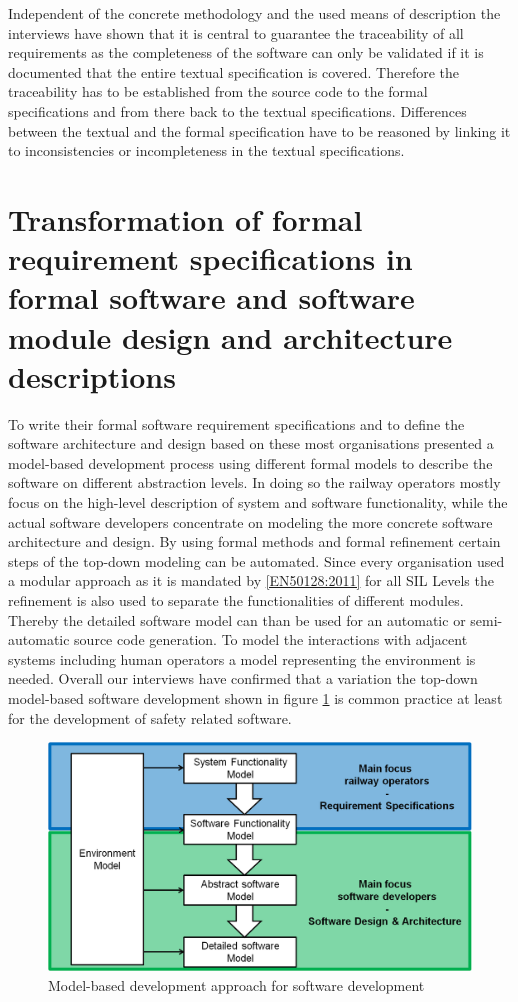 \documentclass{./template/openetcs_report}
\begin{document}
Independent of the concrete methodology and the used means of description the interviews have shown that it is central to guarantee the traceability of all requirements as the completeness of the software can only be validated if it is documented that the entire textual specification is covered. Therefore the traceability has to be established from the source code to the formal specifications and from there back to the textual specifications. Differences between the textual and the formal specification have to be reasoned by linking it to  inconsistencies or incompleteness in the textual specifications. 


\section{Transformation of formal requirement specifications in formal software and software module design and architecture descriptions}

To write their formal software requirement specifications and to define the software architecture and design based on these most organisations presented a model-based development process using different formal models to describe the software on different abstraction levels. In doing so the railway operators mostly focus on the high-level description of system and software functionality, while the actual software developers concentrate on modeling the more concrete software architecture and design. By using formal methods and formal refinement certain steps of the top-down modeling can be automated. Since every organisation used a modular approach as it is mandated by \ref{EN50128:2011} for all SIL Levels the refinement is also used to separate the functionalities of different modules. Thereby the detailed software model can than be used for an automatic or semi-automatic source code generation. To model the interactions with adjacent systems including human operators a model representing the environment is needed. Overall our interviews have confirmed that a variation the top-down model-based software development shown in figure \ref{fig: MBD} is common practice at least for the development of safety related software. 

\begin{figure}[h]
\centering
\includegraphics[scale=0.6]{Model-based_Approach.png}
\caption{Model-based development approach for software development}
\label{fig: MBD}
\end{figure}
\end{document}
